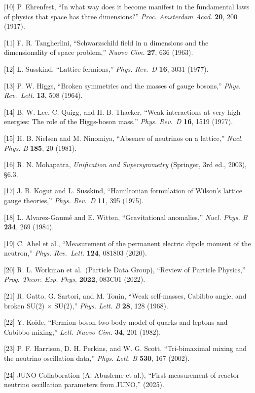 \documentclass[
]{article}
\begin{document}
{[}10{]} P. Ehrenfest, ``In what way does it become manifest in the
fundamental laws of physics that space has three dimensions?''
\emph{Proc. Amsterdam Acad.} \textbf{20}, 200 (1917).

{[}11{]} F. R. Tangherlini, ``Schwarzschild field in n dimensions and
the dimensionality of space problem,'' \emph{Nuovo Cim.} \textbf{27},
636 (1963).

{[}12{]} L. Susskind, ``Lattice fermions,'' \emph{Phys. Rev.~D}
\textbf{16}, 3031 (1977).

{[}13{]} P. W. Higgs, ``Broken symmetries and the masses of gauge
bosons,'' \emph{Phys. Rev.~Lett.} \textbf{13}, 508 (1964).

{[}14{]} B. W. Lee, C. Quigg, and H. B. Thacker, ``Weak interactions at
very high energies: The role of the Higgs-boson mass,'' \emph{Phys.
Rev.~D} \textbf{16}, 1519 (1977).

{[}15{]} H. B. Nielsen and M. Ninomiya, ``Absence of neutrinos on a
lattice,'' \emph{Nucl. Phys. B} \textbf{185}, 20 (1981).

{[}16{]} R. N. Mohapatra, \emph{Unification and Supersymmetry}
(Springer, 3rd ed., 2003), §6.3.

{[}17{]} J. B. Kogut and L. Susskind, ``Hamiltonian formulation of
Wilson's lattice gauge theories,'' \emph{Phys. Rev.~D} \textbf{11}, 395
(1975).

{[}18{]} L. Alvarez-Gaumé and E. Witten, ``Gravitational anomalies,''
\emph{Nucl. Phys. B} \textbf{234}, 269 (1984).

{[}19{]} C. Abel et al., ``Measurement of the permanent electric dipole
moment of the neutron,'' \emph{Phys. Rev.~Lett.} \textbf{124}, 081803
(2020).

{[}20{]} R. L. Workman et al.~(Particle Data Group), ``Review of
Particle Physics,'' \emph{Prog. Theor. Exp. Phys.} \textbf{2022}, 083C01
(2022).

{[}21{]} R. Gatto, G. Sartori, and M. Tonin, ``Weak self-masses, Cabibbo
angle, and broken SU(2) × SU(2),'' \emph{Phys. Lett. B} \textbf{28}, 128
(1968).

{[}22{]} Y. Koide, ``Fermion-boson two-body model of quarks and leptons
and Cabibbo mixing,'' \emph{Lett. Nuovo Cim.} \textbf{34}, 201 (1982).

{[}23{]} P. F. Harrison, D. H. Perkins, and W. G. Scott, ``Tri-bimaximal
mixing and the neutrino oscillation data,'' \emph{Phys. Lett. B}
\textbf{530}, 167 (2002).

{[}24{]} JUNO Collaboration (A. Abusleme et al.), ``First measurement of
reactor neutrino oscillation parameters from JUNO,'' (2025).
\end{document}
